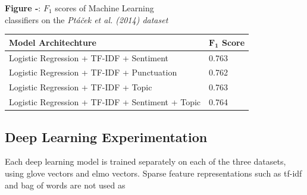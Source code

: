 \documentclass[12pt,a4paper]{article}
\begin{document}
\begin{center}
	\textbf{Figure -}: $F_1$ scores of Machine Learning\\ classifiers on the \textit{Pt\'a\v{c}ek et al. (2014) dataset}
\end{center}


\begin{center}
	\begin{tabular}{|p{9cm}||p{2cm}| }
		\hline
		\textbf{Model Architechture}&  \textbf{$\mathbf{F_1}$ Score}\\
		\hline\hline
		Logistic Regression + TF-IDF + Sentiment   & 0.763\\
		Logistic Regression + TF-IDF + Punctuation & 0.762\\
		Logistic Regression + TF-IDF + Topic   & 0.763\\
		Logistic Regression + TF-IDF + Sentiment + Topic & 0.764\\
		\hline
	\end{tabular}
\end{center}



%




\newpage
\subsection{Deep Learning Experimentation}
\noindent Each deep learning model is trained separately on each of the three datasets, using glove vectors and elmo vectors. Sparse feature representations such as tf-idf and bag of words are not used as
\end{document}
